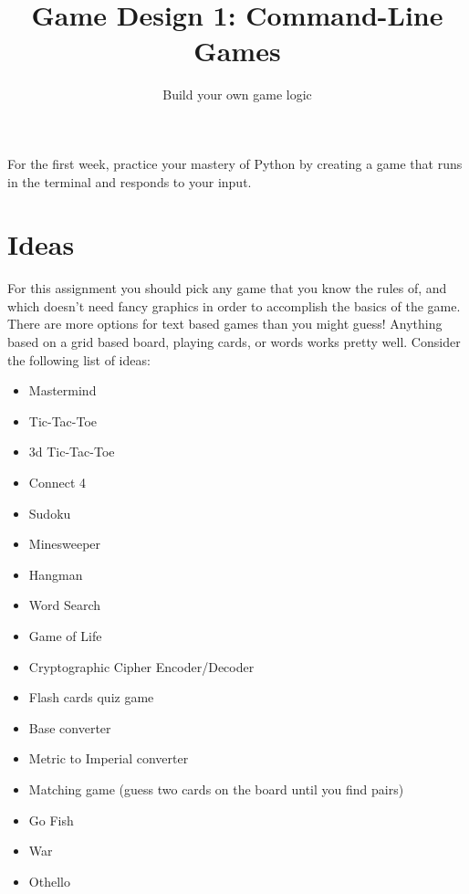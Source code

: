 \documentclass{42-en}
\begin{document}
\title{Game Design 1: Command-Line Games}
\subtitle{Build your own game logic}


\summary
{
	For the first week, practice your mastery of Python by creating a game that runs in the terminal and responds to your input. 
}

\maketitle

\tableofcontents


\chapter{Ideas}

For this assignment you should pick any game that you know the rules of, and which doesn't need fancy graphics in order to accomplish the basics of the game. There are more options for text based games than you might guess! Anything based on a grid based board, playing cards, or words works pretty well. Consider the following list of ideas:

\begin{itemize}

	\item Mastermind
	\item Tic-Tac-Toe
	\item 3d Tic-Tac-Toe
	\item Connect 4
	\item Sudoku
	\item Minesweeper
	\item Hangman
	\item Word Search
	\item Game of Life
	\item Cryptographic Cipher Encoder/Decoder
	\item Flash cards quiz game
	\item Base converter
	\item Metric to Imperial converter
	\item Matching game (guess two cards on the board until you find pairs)
	\item Go Fish
	\item War
	\item Othello

\end{itemize}
\end{document}
